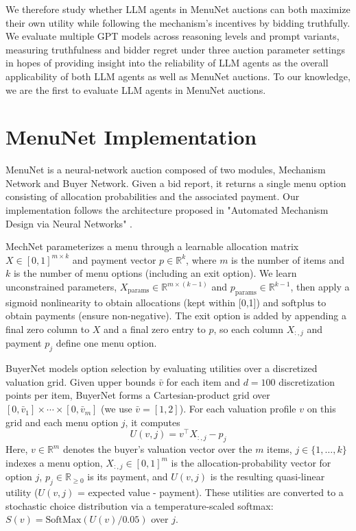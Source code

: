 \documentclass[a4paper]{article}
\begin{document}
We therefore study whether LLM agents in MenuNet auctions can both maximize their own utility while following the mechanism’s incentives by bidding truthfully. We evaluate multiple GPT models across reasoning levels and prompt variants, measuring truthfulness and bidder regret under three auction parameter settings in hopes of providing insight into the reliability of LLM agents as the overall applicability of both LLM agents as well as MenuNet auctions. To our knowledge, we are the first to evaluate LLM agents in MenuNet auctions.



\section{MenuNet Implementation}
MenuNet is a neural-network auction composed of two modules, Mechanism Network and Buyer Network. Given a bid report, it returns a single menu option consisting of allocation probabilities and the associated payment. Our implementation follows the architecture proposed in "Automated Mechanism Design via Neural Networks" \cite{shen2021amdnns}.

MechNet parameterizes a menu through a learnable allocation matrix $X \in [0,1]^{m \times k}$ and payment vector $p \in \mathbb{R}^{k}$, where $m$ is the number of items and $k$ is the number of menu options (including an exit option). We learn unconstrained parameters, $X_{\text{params}} \in \mathbb{R}^{m \times (k-1)}$ and $p_{\text{params}} \in \mathbb{R}^{k-1}$, then apply a sigmoid nonlinearity to obtain allocations (kept within [0,1]) and $\mathrm{softplus}$ to obtain payments (ensure non-negative). The exit option is added by appending a final zero column to $X$ and a final zero entry to $p$, so each column $X_{:,j}$ and payment $p_j$ define one menu option.

BuyerNet models option selection by evaluating utilities over a discretized valuation grid. Given upper bounds $\bar v$ for each item and $d=100$ discretization points per item, BuyerNet forms a Cartesian-product grid over $[0,\bar v_1] \times \cdots \times [0,\bar v_m]$ (we use $\bar v = [1,2]$). For each valuation profile $v$ on this grid and each menu option $j$, it computes
\[
U(v,j) = v^\top X_{:,j} - p_j
\]
Here, $v \in \mathbb{R}^m$ denotes the buyer's valuation vector over the $m$ items, $j \in \{1,\dots,k\}$ indexes a menu option, $X_{:,j} \in [0,1]^m$ is the allocation-probability vector for option $j$, $p_j \in \mathbb{R}_{\ge 0}$ is its payment, and $U(v,j)$ is the resulting quasi-linear utility ($U(v,j)$ = expected value - payment). These utilities are converted to a stochastic choice distribution via a temperature-scaled softmax: $S(v)=\mathrm{SoftMax}(U(v)/0.05)$ over $j$.
\end{document}
